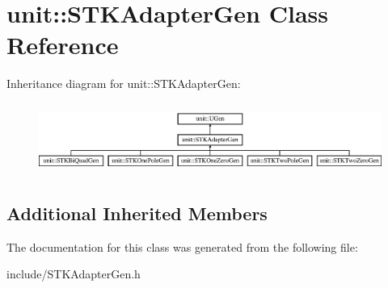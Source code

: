 \hypertarget{classunit_1_1STKAdapterGen}{}\section{unit\+:\+:S\+T\+K\+Adapter\+Gen Class Reference}
\label{classunit_1_1STKAdapterGen}
Inheritance diagram for unit\+:\+:S\+T\+K\+Adapter\+Gen\+:\begin{figure}[H]
\begin{center}
\leavevmode
\includegraphics[height=2.333333cm]{classunit_1_1STKAdapterGen}
\end{center}
\end{figure}
\subsection*{Additional Inherited Members}


The documentation for this class was generated from the following file\+:\begin{DoxyCompactItemize}
\item 
include/S\+T\+K\+Adapter\+Gen.\+h\end{DoxyCompactItemize}
